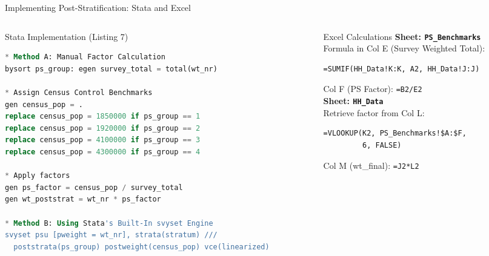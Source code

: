 \documentclass[10pt, aspectratio=169]{beamer}
\begin{document}
\begin{frame}[fragile]{Implementing Post-Stratification: Stata and Excel}
  \begin{columns}[T]
    \begin{column}{0.55\textwidth}
      \begin{block}{Stata Implementation (Listing 7)}
\begin{lstlisting}[language=SQL]
* Method A: Manual Factor Calculation
bysort ps_group: egen survey_total = total(wt_nr)

* Assign Census Control Benchmarks
gen census_pop = .
replace census_pop = 1850000 if ps_group == 1
replace census_pop = 1920000 if ps_group == 2
replace census_pop = 4100000 if ps_group == 3
replace census_pop = 4300000 if ps_group == 4

* Apply factors
gen ps_factor = census_pop / survey_total
gen wt_poststrat = wt_nr * ps_factor

* Method B: Using Stata's Built-In svyset Engine
svyset psu [pweight = wt_nr], strata(stratum) ///
  poststrata(ps_group) postweight(census_pop) vce(linearized)
\end{lstlisting}
      \end{block}
    \end{column}
    \begin{column}{0.42\textwidth}
      \begin{block}{Excel Calculations}
        \textbf{Sheet: \texttt{PS\_Benchmarks}}\\
        Formula in Col E (Survey Weighted Total):
        \begin{lstlisting}[backgroundcolor=\color{white}, frame=none, basicstyle=\ttfamily\tiny]
=SUMIF(HH_Data!K:K, A2, HH_Data!J:J)
        \end{lstlisting}
        Col F (PS Factor): \texttt{=B2/E2}\\
        
        \vspace{0.25cm}
        \textbf{Sheet: \texttt{HH\_Data}}\\
        Retrieve factor from Col L:
        \begin{lstlisting}[backgroundcolor=\color{white}, frame=none, basicstyle=\ttfamily\tiny]
=VLOOKUP(K2, PS_Benchmarks!$A:$F, 
         6, FALSE)
        \end{lstlisting}
        Col M (wt\_final): \texttt{=J2*L2}
      \end{block}
    \end{column}
  \end{columns}
\end{frame}
\end{document}
